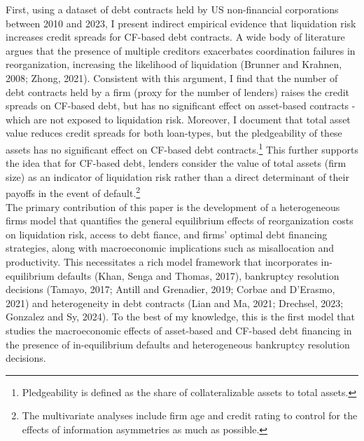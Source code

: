 \documentclass[12pt]{article}
\begin{document}
First, using a dataset of debt contracts held by US non-financial corporations between 2010 and 2023, I present indirect empirical evidence that liquidation risk increases credit spreads for CF-based debt contracts. A wide body of literature argues that the presence of multiple creditors exacerbates coordination failures in reorganization, increasing the likelihood of liquidation (Brunner and Krahnen, 2008; Zhong, 2021). Consistent with this argument, I find that the number of debt contracts held by a firm  (proxy for the number of lenders) raises the credit spreads on CF-based debt, but has no significant effect on asset-based contracts - which are not exposed to liquidation risk. Moreover, I document that total asset value reduces credit spreads for both loan-types, but the pledgeability of these assets has no significant effect on CF-based debt contracts.\footnote{Pledgeability is defined as the share of collateralizable assets to total assets.} This further supports the idea that for CF-based debt, lenders consider the value of total assets (firm size) as an indicator of liquidation risk rather than a direct determinant of their payoffs in the event of default.\footnote{The multivariate analyses include firm age and credit rating to control for the effects of information asymmetries as much as possible.} \vspace{3mm} \\
The primary contribution of this paper is the development of a heterogeneous firms model that quantifies the general equilibrium effects of reorganization costs on liquidation risk, access to debt fiance, and firms' optimal debt financing strategies, along with macroeconomic implications such as misallocation and productivity. This necessitates a rich model framework that incorporates in-equilibrium defaults (Khan, Senga and Thomas, 2017), bankruptcy resolution decisions (Tamayo, 2017; Antill and Grenadier, 2019; Corbae and D'Erasmo, 2021) and heterogeneity in debt contracts (Lian and Ma, 2021; Drechsel, 2023; Gonzalez and Sy, 2024). To the best of my knowledge, this is the first model that studies the macroeconomic effects of asset-based and CF-based debt financing in the presence of in-equilibrium defaults and heterogeneous bankruptcy resolution decisions. \vspace{3mm} \\
\end{document}
